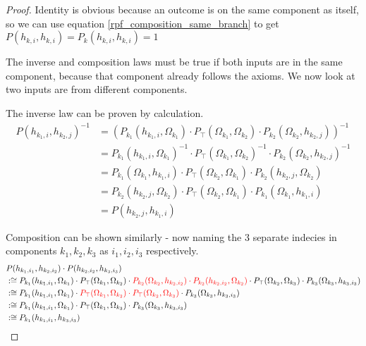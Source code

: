 \documentclass[twoside]{article}
\theoremstyle{plain}%
\theoremstyle{definition}
\theoremstyle{remark}
\begin{document}
\begin{proof}
Identity is obvious because an outcome is on the same component as itself, so we can use equation \ref{rpf_composition_same_branch} to get \(P(h_{k, i}, h_{k, i}) = P_k(h_{k, i}, h_{k, i}) = 1\)

The inverse and composition laws must be true if both inputs are in the same component, because that component already follows the axioms. We now look at two inputs are from different components.

The inverse law can be proven by calculation.
\begin{equation}
\begin{aligned}
P(h_{k_1, i}, h_{k_2, j})^{-1} &= (P_{k_1}(h_{k_1, i}, \Omega_{k_1}) \cdot  P_{\top}(\Omega_{k_1}, \Omega_{k_2}) \cdot P_{k_2}(\Omega_{k_2}, h_{k_2, j}))^{-1} \\
& = P_{k_1}(h_{k_1, i}, \Omega_{k_1})^{-1} \cdot  P_{\top}(\Omega_{k_1}, \Omega_{k_2})^{-1} \cdot P_{k_2}(\Omega_{k_2}, h_{k_2, j})^{-1} \\
& = P_{k_1}(\Omega_{k_1}, h_{k_1, i}) \cdot  P_{\top}(\Omega_{k_2}, \Omega_{k_1}) \cdot P_{k_2}(h_{k_2, j}, \Omega_{k_2}) \\
& = P_{k_2}(h_{k_2, j}, \Omega_{k_2})\cdot  P_{\top}(\Omega_{k_2}, \Omega_{k_1}) \cdot P_{k_1}(\Omega_{k_1}, h_{k_1, i}) \\
& = P(h_{k_2, j}, h_{k_1, i})
\end{aligned}
\end{equation}

Composition can be shown similarly - now naming the 3 separate indecies in components \(k_1, k_2, k_3\) as \(i_1, i_2, i_3\) respectively.
\begin{equation}
\begin{aligned}
& P(h_{k_1, i_1}, h_{k_2, i_2}) \cdot P(h_{k_2, i_2}, h_{k_3, i_3}) \\
& :\cong P_{k_1}(h_{k_1, i_1}, \Omega_{k_1}) \cdot  P_{\top}(\Omega_{k_1}, \Omega_{k_2}) \cdot \textcolor{red}{P_{k_2}(\Omega_{k_2}, h_{k_2, i_2}) \cdot  P_{k_2}(h_{k_2, i_2}, \Omega_{k_2})} \cdot  P_{\top}(\Omega_{k_2}, \Omega_{k_3}) \cdot P_{k_3}(\Omega_{k_3}, h_{k_3, i_3}) \\
& :\cong P_{k_1}(h_{k_1, i_1}, \Omega_{k_1}) \cdot  \textcolor{red}{P_{\top}(\Omega_{k_1}, \Omega_{k_2}) \cdot  P_{\top}(\Omega_{k_2}, \Omega_{k_3})} \cdot P_{k_3}(\Omega_{k_3}, h_{k_3, i_3}) \\
& :\cong P_{k_1}(h_{k_1, i_1}, \Omega_{k_1}) \cdot  P_{\top}(\Omega_{k_1}, \Omega_{k_3}) \cdot P_{k_3}(\Omega_{k_3}, h_{k_3, i_3}) \\
& :\cong P_{k_1}(h_{k_1, i_1}, h_{k_3, i_3})
\end{aligned}
\end{equation}
\end{proof}
\end{document}
